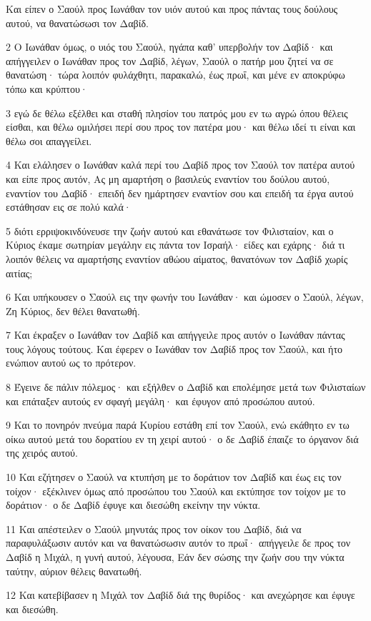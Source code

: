 \par Και είπεν ο Σαούλ προς Ιωνάθαν τον υιόν αυτού και προς πάντας τους δούλους αυτού, να θανατώσωσι τον Δαβίδ.
\par 2 Ο Ιωνάθαν όμως, ο υιός του Σαούλ, ηγάπα καθ' υπερβολήν τον Δαβίδ· και απήγγειλεν ο Ιωνάθαν προς τον Δαβίδ, λέγων, Σαούλ ο πατήρ μου ζητεί να σε θανατώση· τώρα λοιπόν φυλάχθητι, παρακαλώ, έως πρωΐ, και μένε εν αποκρύφω τόπω και κρύπτου·
\par 3 εγώ δε θέλω εξέλθει και σταθή πλησίον του πατρός μου εν τω αγρώ όπου θέλεις είσθαι, και θέλω ομιλήσει περί σου προς τον πατέρα μου· και θέλω ιδεί τι είναι και θέλω σοι απαγγείλει.
\par 4 Και ελάλησεν ο Ιωνάθαν καλά περί του Δαβίδ προς τον Σαούλ τον πατέρα αυτού και είπε προς αυτόν, Ας μη αμαρτήση ο βασιλεύς εναντίον του δούλου αυτού, εναντίον του Δαβίδ· επειδή δεν ημάρτησεν εναντίον σου και επειδή τα έργα αυτού εστάθησαν εις σε πολύ καλά·
\par 5 διότι ερριψοκινδύνευσε την ζωήν αυτού και εθανάτωσε τον Φιλισταίον, και ο Κύριος έκαμε σωτηρίαν μεγάλην εις πάντα τον Ισραήλ· είδες και εχάρης· διά τι λοιπόν θέλεις να αμαρτήσης εναντίον αθώου αίματος, θανατόνων τον Δαβίδ χωρίς αιτίας;
\par 6 Και υπήκουσεν ο Σαούλ εις την φωνήν του Ιωνάθαν· και ώμοσεν ο Σαούλ, λέγων, Ζη Κύριος, δεν θέλει θανατωθή.
\par 7 Και έκραξεν ο Ιωνάθαν τον Δαβίδ και απήγγειλε προς αυτόν ο Ιωνάθαν πάντας τους λόγους τούτους. Και έφερεν ο Ιωνάθαν τον Δαβίδ προς τον Σαούλ, και ήτο ενώπιον αυτού ως το πρότερον.
\par 8 Έγεινε δε πάλιν πόλεμος· και εξήλθεν ο Δαβίδ και επολέμησε μετά των Φιλισταίων και επάταξεν αυτούς εν σφαγή μεγάλη· και έφυγον από προσώπου αυτού.
\par 9 Και το πονηρόν πνεύμα παρά Κυρίου εστάθη επί τον Σαούλ, ενώ εκάθητο εν τω οίκω αυτού μετά του δορατίου εν τη χειρί αυτού· ο δε Δαβίδ έπαιζε το όργανον διά της χειρός αυτού.
\par 10 Και εζήτησεν ο Σαούλ να κτυπήση με το δοράτιον τον Δαβίδ και έως εις τον τοίχον· εξέκλινεν όμως από προσώπου του Σαούλ και εκτύπησε τον τοίχον με το δοράτιον· ο δε Δαβίδ έφυγε και διεσώθη εκείνην την νύκτα.
\par 11 Και απέστειλεν ο Σαούλ μηνυτάς προς τον οίκον του Δαβίδ, διά να παραφυλάξωσιν αυτόν και να θανατώσωσιν αυτόν το πρωΐ· απήγγειλε δε προς τον Δαβίδ η Μιχάλ, η γυνή αυτού, λέγουσα, Εάν δεν σώσης την ζωήν σου την νύκτα ταύτην, αύριον θέλεις θανατωθή.
\par 12 Και κατεβίβασεν η Μιχάλ τον Δαβίδ διά της θυρίδος· και ανεχώρησε και έφυγε και διεσώθη.
